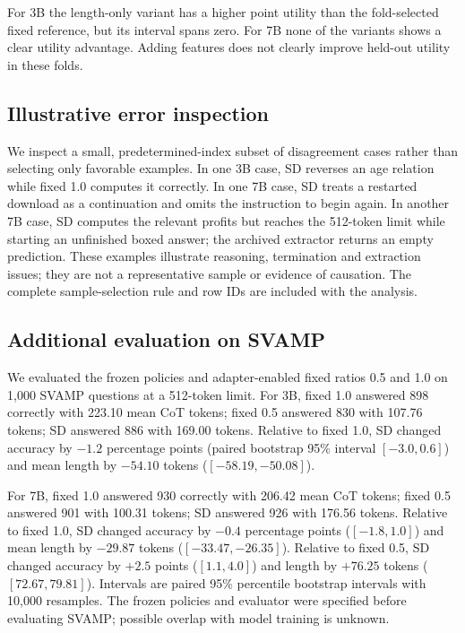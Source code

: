 \documentclass[a4paper,runningheads]{llncs}
\begin{document}
For 3B the length-only variant has a higher point utility than the fold-selected fixed reference, but its interval spans zero. For 7B none of the variants shows a clear utility advantage. Adding features does not clearly improve held-out utility in these folds.

\subsection{Illustrative error inspection}
We inspect a small, predetermined-index subset of disagreement cases rather than selecting only favorable examples. In one 3B case, SD reverses an age relation while fixed 1.0 computes it correctly. In one 7B case, SD treats a restarted download as a continuation and omits the instruction to begin again. In another 7B case, SD computes the relevant profits but reaches the 512-token limit while starting an unfinished boxed answer; the archived extractor returns an empty prediction. These examples illustrate reasoning, termination and extraction issues; they are not a representative sample or evidence of causation. The complete sample-selection rule and row IDs are included with the analysis.

\subsection{Additional evaluation on SVAMP}
We evaluated the frozen policies and adapter-enabled fixed ratios 0.5 and 1.0 on 1,000 SVAMP questions \cite{svamp} at a 512-token limit. For 3B, fixed 1.0 answered 898 correctly with 223.10 mean CoT tokens; fixed 0.5 answered 830 with 107.76 tokens; SD answered 886 with 169.00 tokens. Relative to fixed 1.0, SD changed accuracy by $-1.2$ percentage points (paired bootstrap 95\% interval $[-3.0,0.6]$) and mean length by $-54.10$ tokens ($[-58.19,-50.08]$).

For 7B, fixed 1.0 answered 930 correctly with 206.42 mean CoT tokens; fixed 0.5 answered 901 with 100.31 tokens; SD answered 926 with 176.56 tokens. Relative to fixed 1.0, SD changed accuracy by $-0.4$ percentage points ($[-1.8,1.0]$) and mean length by $-29.87$ tokens ($[-33.47,-26.35]$). Relative to fixed 0.5, SD changed accuracy by $+2.5$ points ($[1.1,4.0]$) and length by $+76.25$ tokens ($[72.67,79.81]$). Intervals are paired 95\% percentile bootstrap intervals with 10,000 resamples. The frozen policies and evaluator were specified before evaluating SVAMP; possible overlap with model training is unknown.
\end{document}
